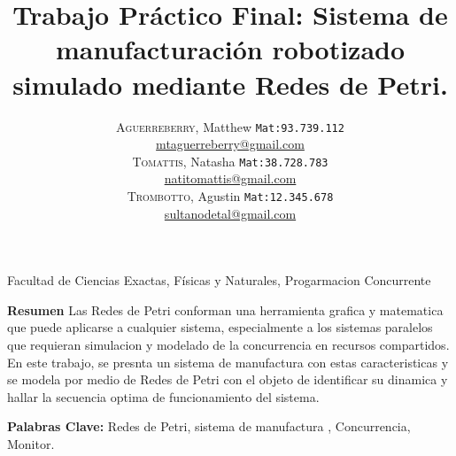 \documentclass[10pt, a4paper,notitlepage]{article}
\newcommand{\HRule}{\rule{\linewidth}{0.5mm}} %
\begin{document}
{\center \large \textsf{Facultad de Ciencias Exactas, Físicas y Naturales, Progarmacion Concurrente\\}}
\title{%
		{ \bfseries{Trabajo Práctico Final: Sistema de manufacturación robotizado simulado mediante Redes de Petri.}}\\[0.4cm]
		} %
\author{
	\textsc{Aguerreberry}, Matthew  {\small \texttt{Mat:93.739.112}}\\
	\href{mailto:mtaguerreberry@gmail.com}{mtaguerreberry@gmail.com}\\
	\textsc{Tomattis}, Natasha  {\small \texttt{Mat:38.728.783}}\\
	\href{mailto:natitomattis@gmail.com}{natitomattis@gmail.com}\\
	\textsc{Trombotto}, Agustin  {\small \texttt{Mat:12.345.678}}\\
	\href{mailto:sultanodetal@gmail.com}{sultanodetal@gmail.com}\\
}

{\let\newpage\relax\maketitle}

\begin{par}  
\textbf{Resumen} Las Redes de Petri conforman una herramienta grafica y matematica que puede aplicarse a cualquier sistema, especialmente a los sistemas paralelos que requieran simulacion y modelado de la concurrencia en recursos compartidos. En este trabajo, se presnta un sistema de manufactura con estas caracteristicas y se modela por medio de Redes de Petri con el objeto de identificar su dinamica y hallar la secuencia optima de funcionamiento del sistema.
\\  
\end{par}

\textbf{Palabras Clave:} Redes de Petri, sistema de manufactura , Concurrencia, Monitor.\\
\end{document}
